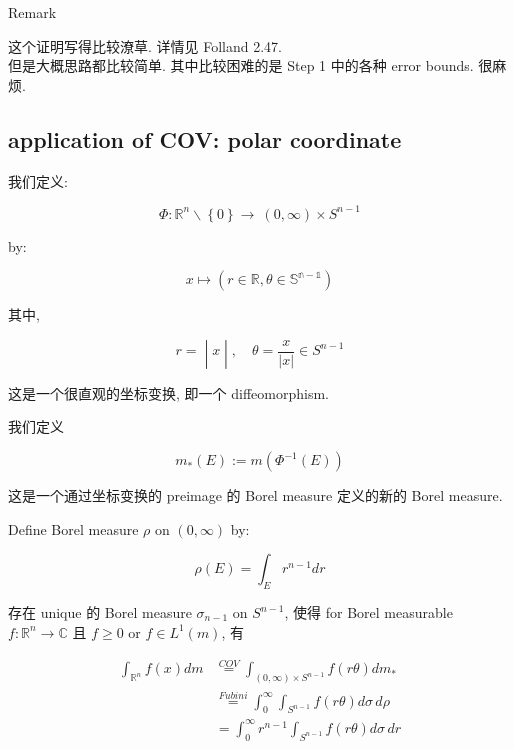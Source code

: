 \begin{qlremark}{Remark}

这个证明写得比较潦草. 详情见 Folland 2.47.\\
但是大概思路都比较简单. 其中比较困难的是 Step 1 中的各种 error bounds. 很麻烦.\\

\end{qlremark}

\subsection{application of COV: polar coordinate}\label{application-of-cov-polar-coordinate}

\begin{definition}{}

我们定义:

\[\Phi:\mathbb{R}^{n}\backslash\left\{ 0 \right\}\rightarrow\ (0,\infty) \times S^{n - 1}\]

by:

\[x\mapsto(r \in \mathbb{R},\theta \in \mathbb{S}^{\mathbb{n} - \mathbb{1}})\]

其中,

\[\left. r = \middle| x \middle| ,\quad\theta = \frac{x}{|x|} \in S^{n - 1} \right.\]

\end{definition}

这是一个很直观的坐标变换, 即一个 diffeomorphism.\\

\begin{definition}{}

我们定义

\[m_{\ast}(E) := m(\Phi^{- 1}(E))\]

\end{definition}

这是一个通过坐标变换的 preimage 的 Borel measure 定义的新的 Borel measure.\\

\begin{theorem}

Define Borel measure \(\rho\) on \((0,\infty)\) by:

\[\rho(E) = \int_{E}r^{n - 1} dr\]

存在 unique 的 Borel measure \(\sigma_{n - 1}\) on \(S^{n - 1}\), 使得 for Borel measurable \(f:\mathbb{R}^{n}\rightarrow\mathbb{C}\) 且 \(f \geq 0\) or \(f \in L^{1}(m)\), 有

\[\begin{matrix}
{\int_{\mathbb{R}^{n}}f(x) dm} & {\overset{COV}{=}\int_{(0,\infty) \times S^{n - 1}}f(r\theta) dm_{\ast}} \\
 & {\overset{Fubini}{=}\int_{0}^{\infty}\int_{S^{n - 1}}f(r\theta) d\sigma\, d\rho} \\
 & {= \int_{0}^{\infty}r^{n - 1}\int_{S^{n - 1}}f(r\theta) d\sigma\, dr}
\end{matrix}\]

\end{theorem}

